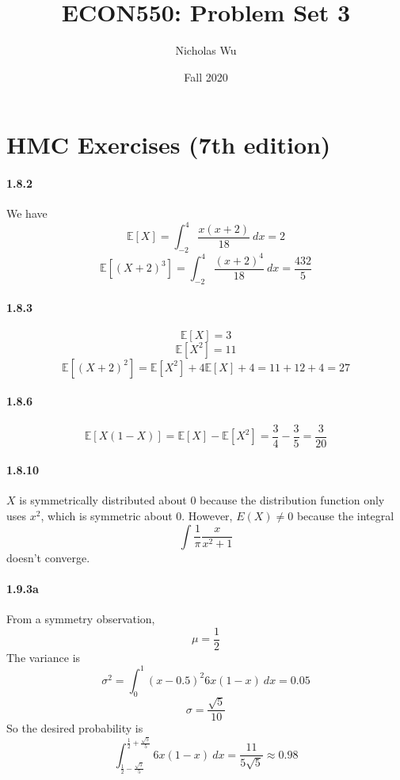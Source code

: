 \documentclass[10pt,letter]{article}
\begin{document}


\title{ECON550: Problem Set 3}

\author{Nicholas Wu}

\date{Fall 2020}

\maketitle
\section*{HMC Exercises (7th edition)}
\paragraph{1.8.2}
We have
\[ \mathbb{E}[X] = \int_{-2}^4 \frac{x(x+2)}{18} \ dx = 2 \]
\[ \mathbb{E}[(X+2)^3] = \int_{-2}^4 \frac{(x+2)^4}{18} \ dx = \frac{432}{5} \]
\paragraph{1.8.3}
\[ \mathbb{E}[X] = 3 \]
\[ \mathbb{E}[X^2] = 11 \]
\[ \mathbb{E}[(X+2)^2] = \mathbb{E}[X^2] + 4\mathbb{E}[X] + 4 = 11 + 12 + 4 = 27 \]
\paragraph{1.8.6}
\[ \mathbb{E}[X(1-X)] = \mathbb{E}[X] - \mathbb{E}[X^2] = \frac{3}{4} - \frac{3}{5} = \frac{3}{20} \]
\paragraph{1.8.10}
$X$ is symmetrically distributed about $0$ because the distribution function only uses $x^2$, which is symmetric about 0. However, $E(X) \neq 0$ because the integral
\[ \int \frac{1}{\pi} \frac{x}{x^2 + 1} \]
doesn't converge.
\paragraph{1.9.3a}
From a symmetry observation,
\[ \mu = \frac{1}{2} \]
The variance is
\[ \sigma^2 = \int _0^1 (x-0.5)^2 6x(1-x) \ dx = 0.05 \]
\[ \sigma = \frac{\sqrt{5}}{10} \]
So the desired probability is
\[ \int_{\frac{1}{2} - \frac{\sqrt{5}}{5}}^{\frac{1}{2} + \frac{\sqrt{5}}{5}} 6x(1-x) \ dx = \frac{11}{5\sqrt{5}} \approx 0.98 \]
\end{document}
